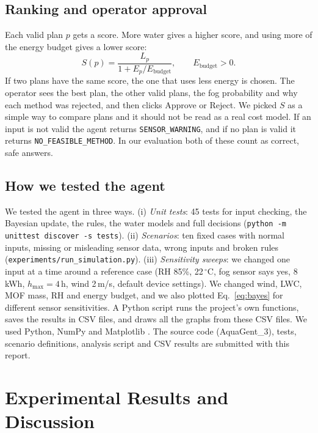 \documentclass[11pt]{article}
\newcommand{\code}[1]{\texttt{\small #1}}
\begin{document}
\subsection{Ranking and operator approval}
Each valid plan $p$ gets a score. More water gives a higher score, and using more of the energy budget gives a lower score:
\begin{equation}
S(p)=\frac{L_p}{1+E_p/E_{\text{budget}}},\qquad E_{\text{budget}}>0. \label{eq:score}
\end{equation}
If two plans have the same score, the one that uses less energy is chosen. The operator sees the best plan, the other valid plans, the fog probability and why each method was rejected, and then clicks Approve or Reject. We picked $S$ as a simple way to compare plans and it should not be read as a real cost model. If an input is not valid the agent returns \code{SENSOR\_WARNING}, and if no plan is valid it returns \code{NO\_FEASIBLE\_METHOD}. In our evaluation both of these count as correct, safe answers.

\subsection{How we tested the agent}
We tested the agent in three ways. (i) \emph{Unit tests}: 45 tests for input checking, the Bayesian update, the rules, the water models and full decisions (\code{python -m unittest discover -s tests}). (ii) \emph{Scenarios}: ten fixed cases with normal inputs, missing or misleading sensor data, wrong inputs and broken rules (\code{experiments/run\_simulation.py}). (iii) \emph{Sensitivity sweeps}: we changed one input at a time around a reference case (RH 85\%, 22\,$^\circ$C, fog sensor says yes, 8\,kWh, $h_{\max}=4$\,h, wind 2\,m/s, default device settings). We changed wind, LWC, MOF mass, RH and energy budget, and we also plotted Eq.~\ref{eq:bayes} for different sensor sensitivities. A Python script runs the project's own functions, saves the results in CSV files, and draws all the graphs from these CSV files. We used Python, NumPy \citep{harris2020numpy} and Matplotlib \citep{hunter2007matplotlib}. The source code (AquaGent\_3), tests, scenario definitions, analysis script and CSV results are submitted with this report.

\newpage
\section{Experimental Results and Discussion}
\end{document}
